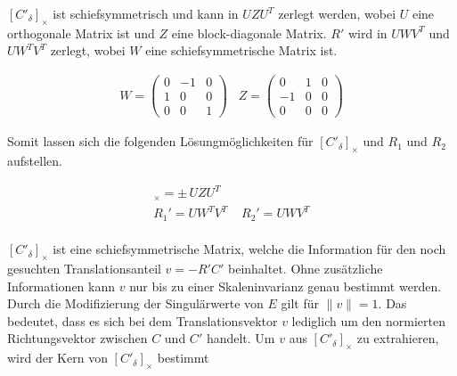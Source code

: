 $[C'_\delta]_\times$ ist schiefsymmetrisch und kann in $UZU^T$ zerlegt werden, wobei $U$ eine orthogonale Matrix ist und $Z$ eine block-diagonale Matrix\cite{HZ}. $R'$ wird in $UWV^T$ und $UW^TV^T$ zerlegt, wobei $W$ eine schiefsymmetrische Matrix ist\cite{Ferid,HZ,phdextrinsicPara}.%



\begin{gather}
W = \begin{pmatrix}
0&-1&0\\
1&0&0\\
0&0&1
\end{pmatrix} \;\;\;
Z=
\begin{pmatrix}
0&1&0\\
-1&0&0\\
0&0&0
\end{pmatrix}
\end{gather}


Somit lassen sich die folgenden Lösungmöglichkeiten für $[C'_\delta]_\times$ und $R_1$ und $R_2$ aufstellen\cite{HZ,Ferid}.


\begin{gather}
[C'_\delta]_\times = \pm \,UZU^T \\
R_1' = UW^TV^T \;\;\;\; R_2' = UWV^T
\end{gather}\\



$[C'_\delta]_\times$ ist eine schiefsymmetrische Matrix, welche die Information für den noch gesuchten Translationsanteil $v = -R'C'$ beinhaltet. Ohne zusätzliche Informationen kann $v$ nur bis zu einer Skaleninvarianz genau bestimmt werden\cite{HZ,Ferid,phdextrinsicPara}. Durch die Modifizierung der Singulärwerte von $E$ gilt für $\parallel v \parallel = 1$\cite{HZ,Ferid}. Das bedeutet, dass es sich bei dem Translationsvektor $v$ lediglich um den normierten Richtungsvektor zwischen $C$ und $C'$ handelt\cite{KIT}. Um $v$ aus $[C'_\delta]_\times$ zu extrahieren, wird der Kern von $[C'_\delta]_\times$ bestimmt

